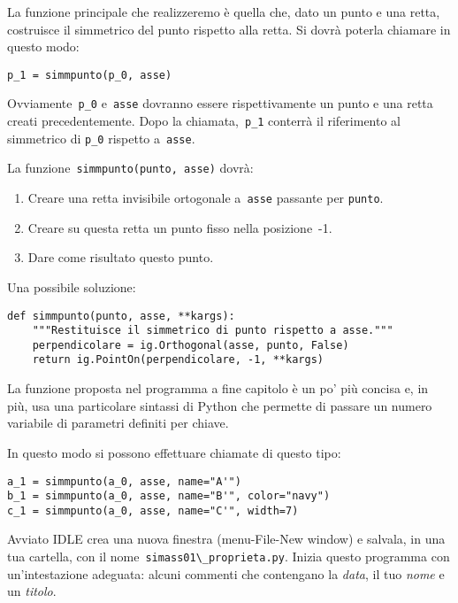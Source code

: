 La funzione principale che realizzeremo è quella che, dato un punto e una
retta, costruisce il simmetrico del punto rispetto alla retta.
Si dovrà poterla chiamare in questo modo:

\begin{lstlisting}
p_1 = simmpunto(p_0, asse)
\end{lstlisting}

Ovviamente~\lstinline{p_0} e~\lstinline{asse} dovranno essere rispettivamente 
un punto e una retta creati precedentemente.
Dopo la chiamata,~\lstinline{p_1} conterrà il riferimento al simmetrico di 
\lstinline{p_0} rispetto a~\lstinline{asse}.

La funzione~\lstinline{simmpunto(punto, asse)} dovrà:

\begin{enumerate} [noitemsep]
\item Creare una retta invisibile ortogonale a~\lstinline{asse} passante per 
\lstinline{punto}.
\item Creare su questa retta un punto fisso nella posizione~-1.
\item Dare come risultato questo punto.
\end{enumerate}

Una possibile soluzione:

\begin{lstlisting}
def simmpunto(punto, asse, **kargs):
    """Restituisce il simmetrico di punto rispetto a asse."""
    perpendicolare = ig.Orthogonal(asse, punto, False)
    return ig.PointOn(perpendicolare, -1, **kargs)
\end{lstlisting}

La funzione proposta nel programma a fine capitolo è un po' più concisa e,
in più, usa una particolare sintassi di Python che permette di passare un
numero variabile di parametri definiti per chiave.

In questo modo si possono effettuare chiamate di questo tipo:

\begin{lstlisting}
a_1 = simmpunto(a_0, asse, name="A'")
b_1 = simmpunto(a_0, asse, name="B'", color="navy")
c_1 = simmpunto(a_0, asse, name="C'", width=7)
\end{lstlisting}

Avviato IDLE crea una nuova finestra (menu-File-New window) e salvala,
in una tua cartella, con il nome~\lstinline{simass01\_proprieta.py}.
Inizia questo programma con un'intestazione adeguata: alcuni commenti che 
contengano la \emph{data}, il tuo \emph{nome} e un \emph{titolo}.

